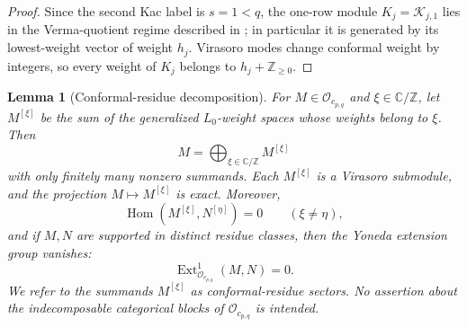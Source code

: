 \documentclass[12pt,leqno]{amsart}
\numberwithin{equation}{section}
\newtheorem{lem}[thm]{Lemma}
\newcommand{\Hom}{\operatorname{Hom}}
\newcommand{\Ext}{\operatorname{Ext}}
\newcommand{\Oc}{\mathcal O}
\newcommand{\Kac}{\mathcal K}
\def\Z{\mathbb{Z}}
\def\C{\mathbb{C}}
\begin{document}
\begin{proof}
Since the second Kac label is $s=1<q$, the one-row module
$K_j=\Kac_{j,1}$ lies in the Verma-quotient regime described in
\cite[Remark~2.2]{McRaeSopin}; in particular it is generated by its
lowest-weight vector of weight $h_j$.
Virasoro modes change conformal weight by integers, so every weight of
$K_j$ belongs to $h_j+\Z_{\ge0}$.
\end{proof}

\begin{lem}[Conformal-residue decomposition]\label{lem:block-projection}
For $M\in\Oc_{c_{p,q}}$ and
$\xi\in\C/\Z$, let $M^{[\xi]}$ be the sum of the generalized
$L_0$-weight spaces whose weights belong to $\xi$.  Then
\[
 M=\bigoplus_{\xi\in\C/\Z}M^{[\xi]}
\]
with only finitely many nonzero summands.  Each $M^{[\xi]}$ is a Virasoro
submodule, and the projection $M\mapsto M^{[\xi]}$ is exact.  Moreover,
\[
 \Hom(M^{[\xi]},N^{[\eta]})=0\qquad(\xi\neq\eta),
\]
and if $M,N$ are supported in distinct residue classes, then the Yoneda extension group vanishes:
\begin{equation}\label{eq:cross-residue-Ext}
 \Ext^1_{\Oc_{c_{p,q}}}(M,N)=0.
\end{equation}
We refer to the summands $M^{[\xi]}$ as \emph{conformal-residue sectors}.
No assertion about the indecomposable categorical blocks of
$\Oc_{c_{p,q}}$ is intended.
\end{lem}
\end{document}
